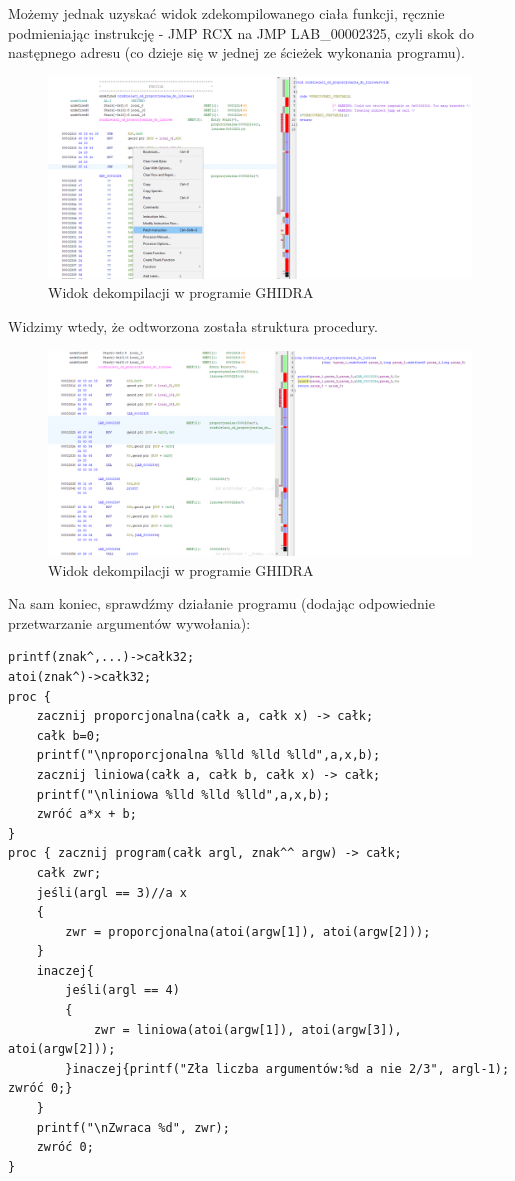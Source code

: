 Możemy jednak uzyskać widok zdekompilowanego ciała funkcji, ręcznie podmieniając instrukcję - JMP RCX na JMP LAB\_00002325, czyli skok do następnego adresu (co dzieje się w jednej ze ścieżek wykonania programu). 
\FloatBarrier
\begin{figure}[H]
    \centering
    \includegraphics[width=1.2\textwidth]{images/2.rozdzielacz/3.png}
    \caption{Widok dekompilacji w programie GHIDRA}
\end{figure}
Widzimy wtedy, że odtworzona została struktura procedury.
\begin{figure}[H]
    \centering
    \includegraphics[width=1.2\textwidth]{images/2.rozdzielacz/4.png}
    \caption{Widok dekompilacji w programie GHIDRA}
\end{figure}

Na sam koniec, sprawdźmy działanie programu (dodając odpowiednie przetwarzanie argumentów wywołania):
\begin{lstlisting}
printf(znak^,...)->całk32;
atoi(znak^)->całk32;
proc {
    zacznij proporcjonalna(całk a, całk x) -> całk;
    całk b=0;
    printf("\nproporcjonalna %lld %lld %lld",a,x,b);
    zacznij liniowa(całk a, całk b, całk x) -> całk;
    printf("\nliniowa %lld %lld %lld",a,x,b);
    zwróć a*x + b;
}
proc { zacznij program(całk argl, znak^^ argw) -> całk;
    całk zwr;
    jeśli(argl == 3)//a x
    {
        zwr = proporcjonalna(atoi(argw[1]), atoi(argw[2]));
    }
    inaczej{
        jeśli(argl == 4)
        {
            zwr = liniowa(atoi(argw[1]), atoi(argw[3]), atoi(argw[2]));
        }inaczej{printf("Zła liczba argumentów:%d a nie 2/3", argl-1); zwróć 0;}
    }
    printf("\nZwraca %d", zwr);
    zwróć 0;
}
\end{lstlisting}

